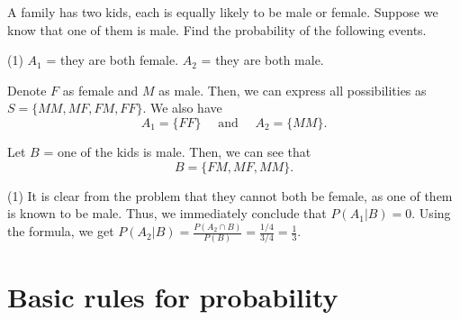  
\begin{frame}[t] 
\begin{ex} 
A family has two kids, each is equally likely to be male or female. Suppose we know that one of them is male. Find the probability of the following events.
\begin{tasks}(1)
\task $A_1$ = they are both female.
\task $A_2$ = they are both male.
\end{tasks}
\end{ex} 
\end{frame}


\begin{frame}[t] 
\begin{sol}
Denote $F$ as female and $M$ as male. Then, we can express all possibilities as $S = \{MM, MF, FM, FF\}$. We also have  
\[A_1 = \{FF\} \quad \text{ and } \quad A_2 = \{MM\}.\]

\medskip
Let $B$ = one of the kids is male. Then, we can see that 
\[B = \{FM, MF, MM\}.\]
\begin{tasks}(1)
\task It is clear from the problem that they cannot both be female, as one of them is known to be male. Thus, we immediately conclude that $P(A_1|B) = 0$.
\task Using the formula, we get $P(A_2 |B) = \frac{P(A_2 \cap B)}{P(B)} = \frac{1/4}{3/4} = \frac{1}{3}$.
\end{tasks}
\end{sol}
\end{frame}

\section[Basic rules]{Basic rules for probability}
\frame{\sectionpage}

